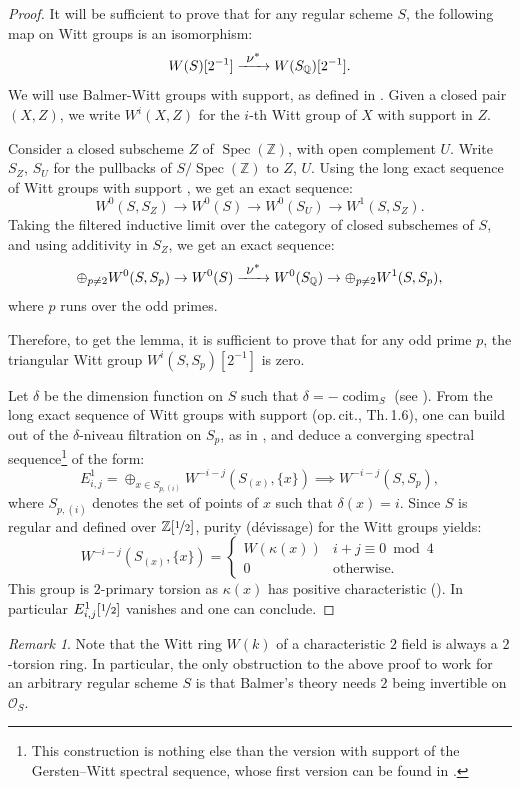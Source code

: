 \documentclass[JEP,XML,SOM,Unicode]{cedram}
\def\To#1{\mathchoice{\xrightarrow{\textstyle\kern4pt#1\kern3pt}}{\stackrel{#1}{\longrightarrow}}{}{}}
\DeclareMathOperator{\codim}{codim}
\DeclareMathOperator{\spec}{Spec}
\newcommand{\ZZ} {\mathbb Z}
\newcommand{\ZZot} {\mathbb Z[\nicefrac 1 2]}
\newcommand{\ot} {{\nicefrac 1 2}}
\newcommand{\QQ} {\mathbb Q}
\theoremstyle{remark}
\newtheorem{rem}[thm]{Remark}
\theoremstyle{definition}
\numberwithin{equation}{thm}
\begin{document}
\begin{proof}
It will be sufficient to prove that for any regular scheme $S$, the following map on Witt groups
is an isomorphism:
\[
W(S)[2^{-1}] \To{\nu^*} W(S_\QQ)[2^{-1}].
\]
We will use Balmer-Witt groups with support, as defined in \cite[\S 1]{BalmerWitt}.
Given a closed pair $(X,Z)$, we write $W^i(X,Z)$ for the $i$-th Witt group of $X$ with support in $Z$.

Consider a closed subscheme $Z$ of $\spec(\ZZ)$, with open complement $U$.
Write $S_Z$, $S_U$ for the pullbacks of $S/\spec(\ZZ)$ to $Z$, $U$.
Using the long exact sequence of Witt groups with support \cite[1.7]{BalmerWitt},
we get an exact sequence:
\[
W^0(S,S_Z) \to W^0(S) \to W^0(S_U) \to W^1(S,S_Z).
\]
Taking the filtered inductive limit over the category of closed subschemes of $S$,
and using additivity in $S_Z$, we get an exact sequence:
\[
\oplus_{p\neq 2} W^0(S,S_p) \to W^0(S) \To{\nu^*} W^0(S_\QQ) \to \oplus_{p\neq 2} W^1(S,S_p),
\]
where $p$ runs over the odd primes.

Therefore, to get the lemma, it is sufficient to prove that for any odd prime $p$,
the triangular Witt group $W^i(S,S_p)[2^{-1}]$ is zero.

Let $\delta$ be the dimension function on $S$ such that $\delta=-\codim_S$
(see \eg \cite[\S 1.1]{BD1}).
From the long exact sequence of Witt groups with support (op.\,cit., Th.\,1.6),
one can build out of the $\delta$-niveau filtration on $S_p$,
as in \cite[\S 3.1]{BD1}, and deduce a converging spectral
sequence\footnote{This construction is nothing else than the version with support of the Gersten--Witt spectral sequence,
whose first version can be found in \cite{BalmerWalter}.} of the form:
\[
E^1_{i,j}=\oplus_{x \in S_{p,(i)}} W^{-i-j}(S_{(x)},\{x\}) \implies W^{-i-j}(S,S_p),
\]
where $S_{p,{(i)}}$ denotes the set of points of $x$ such that $\delta(x)=i$.
Since $S$ is regular and defined over $\ZZot$, purity (dévissage) for the Witt groups \cite[Th.\,6.1]{BalmerWalter} yields:
\[
W^{-i-j}(S_{(x)},\{x\})=
\begin{cases}
W(\kappa(x)) & i+j\equiv 0 \bmod 4 \\
0 & \text{otherwise.}
\end{cases}
\]
This group is $2$-primary torsion as $\kappa(x)$ has positive characteristic
(\cite[VIII\,3.2 \& 6.15]{LamQuadratic}).
In particular $E^1_{i,j}[\ot]$ vanishes and one can conclude.
\end{proof}

\begin{rem}
Note that the Witt ring $W(k)$ of a characteristic $2$ field is always a $2$-torsion ring.
In particular, the only obstruction to the above proof to work for an arbitrary regular scheme $S$
is that Balmer's theory needs $2$ being invertible on $\mathcal O_S$.
\end{rem}
\end{document}
